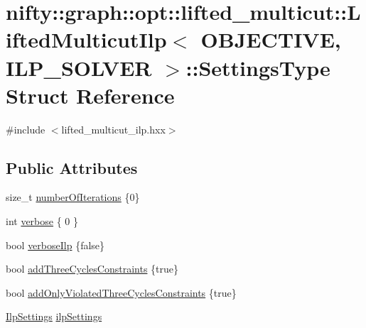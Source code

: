 \hypertarget{structnifty_1_1graph_1_1opt_1_1lifted__multicut_1_1LiftedMulticutIlp_1_1SettingsType}{}\section{nifty\+:\+:graph\+:\+:opt\+:\+:lifted\+\_\+multicut\+:\+:Lifted\+Multicut\+Ilp$<$ O\+B\+J\+E\+C\+T\+I\+VE, I\+L\+P\+\_\+\+S\+O\+L\+V\+ER $>$\+:\+:Settings\+Type Struct Reference}
\label{structnifty_1_1graph_1_1opt_1_1lifted__multicut_1_1LiftedMulticutIlp_1_1SettingsType}


{\ttfamily \#include $<$lifted\+\_\+multicut\+\_\+ilp.\+hxx$>$}

\subsection*{Public Attributes}
\begin{DoxyCompactItemize}
\item 
size\+\_\+t \hyperlink{structnifty_1_1graph_1_1opt_1_1lifted__multicut_1_1LiftedMulticutIlp_1_1SettingsType_a99fddca7fde668b72ec663a2cf5cb0de}{number\+Of\+Iterations} \{0\}
\item 
int \hyperlink{structnifty_1_1graph_1_1opt_1_1lifted__multicut_1_1LiftedMulticutIlp_1_1SettingsType_a221340d09030496460504369976d1ac8}{verbose} \{ 0 \}
\item 
bool \hyperlink{structnifty_1_1graph_1_1opt_1_1lifted__multicut_1_1LiftedMulticutIlp_1_1SettingsType_a84a803f631cd8b6859454079873561e5}{verbose\+Ilp} \{false\}
\item 
bool \hyperlink{structnifty_1_1graph_1_1opt_1_1lifted__multicut_1_1LiftedMulticutIlp_1_1SettingsType_a9f6163c62276104aa84ab43701b17aba}{add\+Three\+Cycles\+Constraints} \{true\}
\item 
bool \hyperlink{structnifty_1_1graph_1_1opt_1_1lifted__multicut_1_1LiftedMulticutIlp_1_1SettingsType_a7cd50631ab201892583498afd1c84ecf}{add\+Only\+Violated\+Three\+Cycles\+Constraints} \{true\}
\item 
\hyperlink{classnifty_1_1graph_1_1opt_1_1lifted__multicut_1_1LiftedMulticutIlp_af8d52d69e1ff05b34c3ef7b52d63388c}{Ilp\+Settings} \hyperlink{structnifty_1_1graph_1_1opt_1_1lifted__multicut_1_1LiftedMulticutIlp_1_1SettingsType_a7f449985df27257831f96404f0355cc3}{ilp\+Settings}
\end{DoxyCompactItemize}


